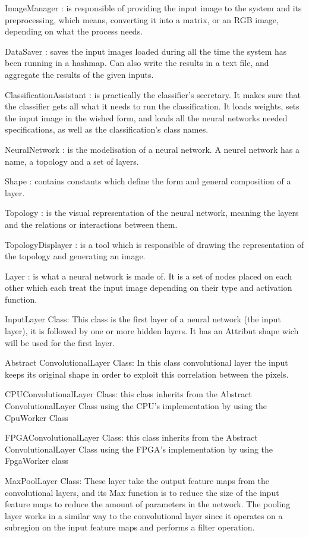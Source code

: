 \documentclass[parskip=full]{scrartcl}
\begin{document}
ImageManager : is responsible of providing the input image to the system and its preprocessing, which means, converting it into a matrix, or an RGB image, depending on what the process needs.

DataSaver : saves the input images loaded during all the time the system has been running in a hashmap. Can also write the results in a text file, and aggregate the results of the given inputs.

ClassificationAssistant : is practically the classifier's secretary. It makes sure that the classifier gets all what it needs to run the classification. It loads weights, sets the input image in the wished form, and loads all the neural networks needed specifications, as well as the classification's class names.

NeuralNetwork : is the modelisation of a neural network. A neurel network has a name, a topology and a set of layers.

Shape : contains constants which define the form and general composition of a layer.

Topology : is the visual representation of the neural network, meaning the layers and the relations or interactions between them.

TopologyDisplayer : is a tool which is responsible of drawing the representation of the topology and generating an image.

Layer : is what a neural network is made of. It is a set of nodes placed on each other which each treat the input image depending on their type and activation function.




InputLayer Class: This class is the first layer of a neural network (the input layer), it is followed by one or more hidden layers.  It has an Attribut shape wich will be used for the first layer.

Abstract ConvolutionalLayer Class: In this class convolutional layer the input keeps its original shape in order to exploit this correlation between the pixels. 

CPUConvolutionalLayer Class: this class inherits from the Abstract ConvolutionalLayer Class using the CPU’s implementation by using the CpuWorker Class

FPGAConvolutionalLayer Class: this class inherits from the Abstract ConvolutionalLayer Class using the FPGA’s implementation by using the FpgaWorker class

MaxPoolLayer Class: These layer take the output feature maps from the convolutional layers, and its Max function is to reduce the size of the input feature maps to reduce the amount of parameters in the network.
The pooling layer works in a similar way to the convolutional layer since it operates on a subregion on the input feature maps and performs a filter operation.
\end{document}
